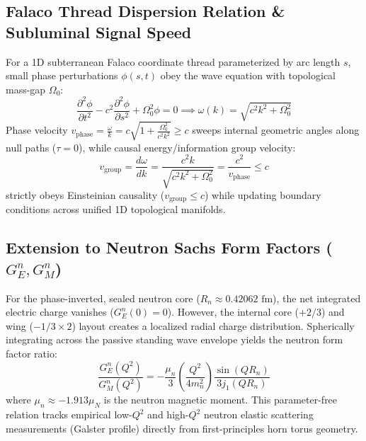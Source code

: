 \documentclass[11pt,a4paper]{article}
\begin{document}
	\subsection{Falaco Thread Dispersion Relation \& Subluminal Signal Speed}
	For a 1D subterranean Falaco coordinate thread parameterized by arc length $s$, small phase perturbations $\phi(s, t)$ obey the wave equation with topological mass-gap $\Omega_0$:
	\begin{equation}
		\frac{\partial^2 \phi}{\partial t^2} - c^2 \frac{\partial^2 \phi}{\partial s^2} + \Omega_0^2 \phi = 0 \implies \omega(k) = \sqrt{c^2 k^2 + \Omega_0^2}
	\end{equation}
	Phase velocity $v_{\text{phase}} = \frac{\omega}{k} = c \sqrt{1 + \frac{\Omega_0^2}{c^2 k^2}} \ge c$ sweeps internal geometric angles along null paths ($\tau = 0$), while causal energy/information group velocity:
	\begin{equation}
		v_{\text{group}} = \frac{d\omega}{dk} = \frac{c^2 k}{\sqrt{c^2 k^2 + \Omega_0^2}} = \frac{c^2}{v_{\text{phase}}} \le c
	\end{equation}
	strictly obeys Einsteinian causality ($v_{\text{group}} \le c$) while updating boundary conditions across unified 1D topological manifolds.
	
	\subsection{Extension to Neutron Sachs Form Factors ($G_E^n, G_M^n$)}
	For the phase-inverted, sealed neutron core ($R_n \approx 0.42062\text{ fm}$), the net integrated electric charge vanishes ($G_E^n(0) = 0$). However, the internal core ($+2/3$) and wing ($-1/3 \times 2$) layout creates a localized radial charge distribution. Spherically integrating across the passive standing wave envelope yields the neutron form factor ratio:
	\begin{equation}
		\frac{G_E^n(Q^2)}{G_M^n(Q^2)} = -\frac{\mu_n}{3} \left(\frac{Q^2}{4 m_n^2}\right) \frac{\sin(Q R_n)}{3 j_1(Q R_n)}
	\end{equation}
	where $\mu_n \approx -1.913 \mu_N$ is the neutron magnetic moment. This parameter-free relation tracks empirical low-$Q^2$ and high-$Q^2$ neutron elastic scattering measurements (Galster profile) directly from first-principles horn torus geometry.
	
	\appendix
	
	\renewcommand{\theequation}{\thesection.\arabic{equation}}
	\renewcommand{\thefigure}{\thesection.\arabic{figure}}
	\renewcommand{\thetable}{\thesection.\arabic{table}}
	\setcounter{equation}{0}
	\setcounter{figure}{0}
	\setcounter{table}{0}
	
\end{document}
